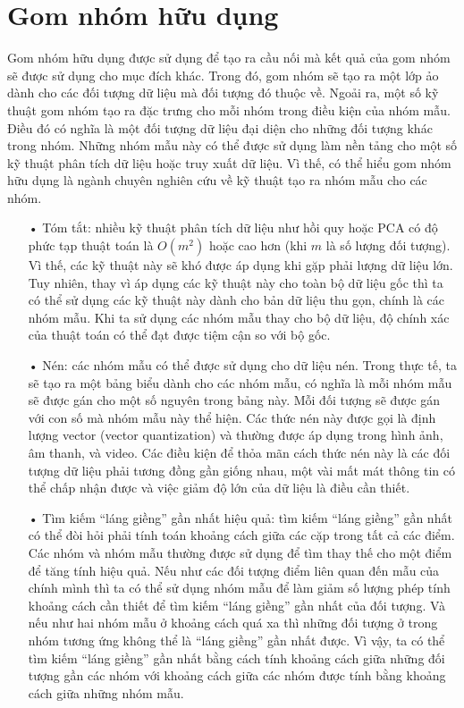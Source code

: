 \section{Gom nhóm hữu dụng}
Gom nhóm hữu dụng được sử dụng để tạo ra cầu nối mà kết quả của gom nhóm sẽ được sử dụng cho mục đích khác.
Trong đó, gom nhóm sẽ tạo ra một lớp ảo dành cho các đối tượng dữ liệu mà đối tượng đó thuộc về.
Ngoải ra, một số kỹ thuật gom nhóm tạo ra đặc trưng cho mỗi nhóm trong điều kiện của nhóm mẫu.
Điều đó có nghĩa là một đối tượng dữ liệu đại diện cho những đối tượng khác trong nhóm.
Những nhóm mẫu này có thể được sử dụng làm nền tảng cho một số kỹ thuật phân tích dữ liệu hoặc truy xuất dữ liệu.
Vì thế, có thể hiểu gom nhóm hữu dụng là ngành chuyên nghiên cứu về kỹ thuật tạo ra nhóm mẫu cho các nhóm.
\begin{enumerate}
\item[•]Tóm tắt: nhiều kỹ thuật phân tích dữ liệu như hồi quy hoặc PCA có độ phức tạp thuật toán là $O(m^2)$ hoặc cao hơn (khi $m$ là số lượng đối tượng).
Vì thế, các kỹ thuật này sẽ khó được áp dụng khi gặp phải lượng dữ liệu lớn.
Tuy nhiên, thay vì áp dụng các kỹ thuật này cho toàn bộ dữ liệu gốc thì ta có thể sử dụng các kỹ thuật này dành cho bản dữ liệu thu gọn, chính là các nhóm mẫu.
Khi ta sử dụng các nhóm mẫu thay cho bộ dữ liệu, độ chính xác của thuật toán có thể đạt được tiệm cận so với bộ gốc. 
\item[•]Nén: các nhóm mẫu có thể được sử dụng cho dữ liệu nén.
Trong thực tế, ta sẽ tạo ra một bảng biểu dành cho các nhóm mẫu, có nghĩa là mỗi nhóm mẫu sẽ được gán cho một số nguyên trong bảng này.
Mỗi đối tượng sẽ được gán với con số mà nhóm mẫu này thể hiện.
Các thức nén này được gọi là định lượng vector (vector quantization) và thường được áp dụng trong hình ảnh, âm thanh, và video.
Các điều kiện để thỏa mãn cách thức nén này là các đối tượng dữ liệu  phải tương đồng gần giống nhau, một vài mất mát thông tin có thể chấp nhận được và việc giảm độ lớn của dữ liệu là điều cần thiết.
\item[•]Tìm kiếm ``láng giềng'' gần nhất hiệu quả: tìm kiếm ``láng giềng'' gần nhất có thể đòi hỏi phải tính toán khoảng cách giữa các cặp trong tất cả các điểm.
Các nhóm và nhóm mẫu thường được sử dụng để tìm thay thế cho một điểm để tăng tính hiệu quả.
Nếu như các đối tượng điểm liên quan đến mẫu của chính mình thì ta có thể sử dụng nhóm mẫu để làm giảm số lượng phép tính khoảng cách cần thiết để tìm kiếm ``láng giềng'' gần nhất của đối tượng.
Và nếu như hai nhóm mẫu ở khoảng cách quá xa thì những đối tượng ở trong nhóm tương ứng không thể là ``láng giềng'' gần nhất được.
Vì vậy, ta có thể tìm kiếm ``láng giềng'' gần nhất bằng cách tính khoảng cách giữa những đối tượng gần các nhóm với khoảng cách giữa các nhóm được tính bằng khoảng cách giữa những nhóm mẫu.
\end{enumerate}

